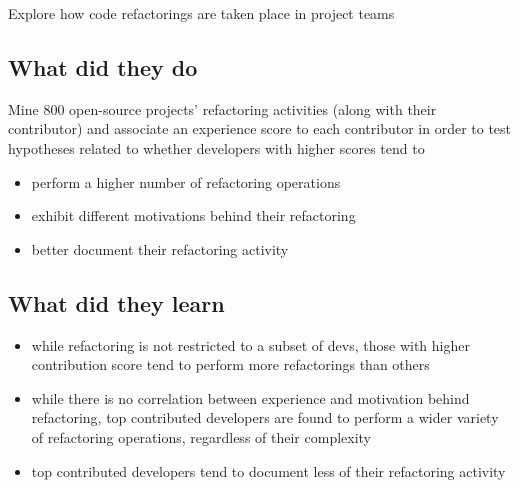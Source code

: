 Explore how code refactorings are taken place in project teams

\subsection{What did they do}

Mine 800 open-source projects' refactoring activities (along with their contributor) and associate an experience score to each contributor in order to test hypotheses related to whether developers with higher scores tend to

\begin{itemize}
    \item perform a higher number of refactoring operations
    \item exhibit different motivations behind their refactoring
    \item better document their refactoring activity
\end{itemize}

\subsection{What did they learn}

\begin{itemize}
    \item while refactoring is not restricted to a subset of devs, those with higher contribution score tend to perform more refactorings than others
    \item while there is no correlation between experience and motivation behind refactoring, top contributed developers are found to perform a wider variety of refactoring operations, regardless of their complexity
    \item top contributed developers tend to document less of their refactoring activity
\end{itemize}
